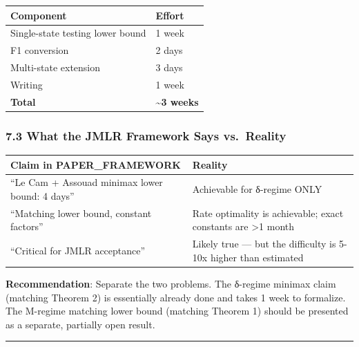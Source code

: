 \documentclass[
  12pt,
]{ctexart}
\begin{document}
\begin{longtable}[]{@{}ll@{}}
\toprule\noalign{}
Component & Effort \\
\midrule\noalign{}
\endhead
\bottomrule\noalign{}
\endlastfoot
Single-state testing lower bound & 1 week \\
F1 conversion & 2 days \\
Multi-state extension & 3 days \\
Writing & 1 week \\
\textbf{Total} & \textbf{\textasciitilde3 weeks} \\
\end{longtable}

\subsubsection{7.3 What the JMLR Framework Says
vs.~Reality}\label{what-the-jmlr-framework-says-vs.-reality}

\begin{longtable}[]{@{}
  >{\raggedright\arraybackslash}p{}
  >{\raggedright\arraybackslash}p{}@{}}
\toprule\noalign{}
\begin{minipage}[b]{\linewidth}\raggedright
Claim in PAPER\_FRAMEWORK
\end{minipage} & \begin{minipage}[b]{\linewidth}\raggedright
Reality
\end{minipage} \\
\midrule\noalign{}
\endhead
\bottomrule\noalign{}
\endlastfoot
``Le Cam + Assouad minimax lower bound: 4 days'' & Achievable for
δ-regime ONLY \\
``Matching lower bound, constant factors'' & Rate optimality is
achievable; exact constants are \textgreater1 month \\
``Critical for JMLR acceptance'' & Likely true --- but the difficulty is
5-10x higher than estimated \\
\end{longtable}

\textbf{Recommendation}: Separate the two problems. The δ-regime minimax
claim (matching Theorem 2) is essentially already done and takes 1 week
to formalize. The M-regime matching lower bound (matching Theorem 1)
should be presented as a separate, partially open result.

\begin{center}\rule{0.5\linewidth}{0.5pt}\end{center}
\end{document}
